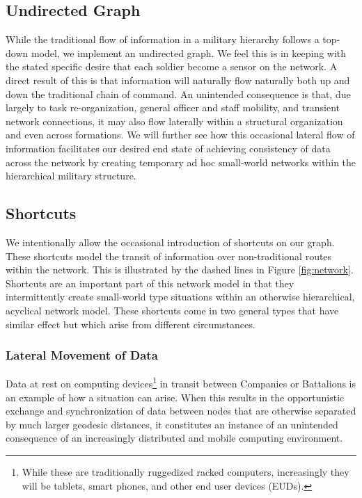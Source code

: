 \documentclass[10pt]{./IEEEtran}
\begin{document}
\subsection{Undirected Graph}
While the traditional flow of information in a military hierarchy follows a top-down model, we implement an undirected graph.  We feel this is in keeping with the stated specific desire that each soldier become a sensor on the network\cite{Patton:2003}.  A direct result of this is that information will naturally flow naturally both up and down the traditional chain of command.  An unintended consequence is that, due largely to task re-organization, general officer and staff mobility, and transient network connections, it may also flow laterally within a structural organization and even across formations.  We will further see how this occasional lateral flow of information facilitates our desired end state of achieving consistency of data across the network by creating temporary ad hoc small-world networks\cite{Watts:1998} within the hierarchical military structure.

\subsection{Shortcuts}
We intentionally allow the occasional introduction of shortcuts on our graph.  These shortcuts model the transit of information over non-traditional routes within the network.  This is illustrated by the dashed lines in Figure \ref{fig:network}.  Shortcuts are an important part of this network model in that they intermittently create small-world type situations\cite{Vahdat:2000} within an otherwise hierarchical, acyclical network model.  These shortcuts come in two general types that have similar effect but which arise from different circumstances.

\subsubsection{Lateral Movement of Data} 
Data at rest on computing devices\footnote{While these are traditionally ruggedized racked computers, increasingly they will be tablets, smart phones, and other end user devices (EUDs).} in transit between Companies or Battalions is an example of how a situation can arise.  When this results in the opportunistic exchange and synchronization of data between nodes that are otherwise separated by much larger geodesic distances,  it constitutes an instance of an unintended consequence of an increasingly distributed and mobile computing environment.
\end{document}
